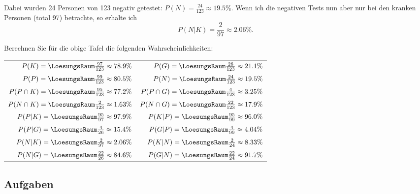 Dabei wurden 24 Personen von 123 negativ getestet: $P(N) =
\frac{24}{123}\approx 19.5\%$.
Wenn ich die negativen Tests nun aber nur bei den kranken Personen
(total 97) betrachte, so erhalte ich
$$P(N|K) = \frac{2}{97} \approx 2.06\%.$$


Berechnen Sie für die obige Tafel die folgenden Wahrscheinlichkeiten:

\renewcommand{\arraystretch}{2}
\begin{tabular}{rr}
$P(K) = \LoesungsRaum{\frac{97}{123} \approx{} 78.9\%}$&
$P(G) = \LoesungsRaum{\frac{26}{123} \approx{} 21.1\%}$\\
$P(P) = \LoesungsRaum{\frac{99}{123} \approx{} 80.5\%}$&
$P(N) = \LoesungsRaum{\frac{24}{123} \approx{} 19.5\%}$\\


$P(P\cap K) = \LoesungsRaum{\frac{95}{123} \approx{} 77.2\%}$&
$P(P\cap G) = \LoesungsRaum{\frac{4}{123}  \approx{} 3.25\%}$\\
$P(N\cap K) = \LoesungsRaum{\frac{2}{123}  \approx{} 1.63\%}$&
$P(N\cap G) = \LoesungsRaum{\frac{22}{123} \approx{} 17.9\%}$\\

$P(P|K) = \LoesungsRaum{\frac{95}{97} \approx{} 97.9\%}$&
$P(K|P) = \LoesungsRaum{\frac{95}{99} \approx{} 96.0\%}$\\

$P(P|G) = \LoesungsRaum{\frac{4}{26} \approx{} 15.4\%}$&
$P(G|P) = \LoesungsRaum{\frac{4}{99} \approx{} 4.04\%}$\\

$P(N|K) = \LoesungsRaum{\frac{2}{97} \approx{} 2.06\%}$&
$P(K|N) = \LoesungsRaum{\frac{2}{24} \approx{} 8.33\%}$\\

$P(N|G) = \LoesungsRaum{\frac{22}{26} \approx{} 84.6\%}$&
$P(G|N) = \LoesungsRaum{\frac{22}{24} \approx{} 91.7\%}$\\
\end{tabular}
\renewcommand{\arraystretch}{1}


\subsection*{Aufgaben}
\newpage
